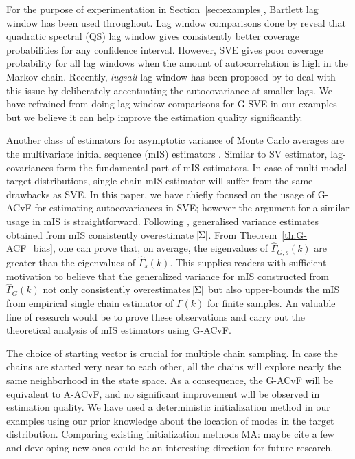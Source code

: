 \documentclass[11pt]{article}
\theoremstyle{remark}
\begin{document}
For the purpose of experimentation in Section~\ref{sec:examples}, Bartlett lag window has been used throughout. Lag window comparisons done by \cite{andr:1991} reveal that quadratic spectral (QS) lag window gives consistently better coverage probabilities for any confidence interval. However, SVE gives poor coverage probability for all lag windows when the amount of autocorrelation is high in the Markov chain. Recently, \textit{lugsail} lag window has been proposed by \cite{vats2018lugsail} to deal with this issue by deliberately accentuating the autocovariance at smaller lags. We have refrained from doing lag window comparisons for G-SVE in our examples but we believe it can help improve the estimation quality significantly.
%

Another class of estimators for asymptotic variance of Monte Carlo averages are the multivariate initial sequence (mIS) estimators \citep{dai:jon:2017}. Similar to SV estimator, lag-covariances form the fundamental part of mIS estimators. In case of multi-modal target distributions, single chain mIS estimator will suffer from the same drawbacks as SVE. In this paper, we have chiefly focused on the usage of G-ACvF for estimating autocovariances in SVE; however the argument for a similar usage in mIS is straightforward.  Following \cite{dai:jon:2017}, generalised variance estimates obtained from mIS consistently overestimate $\abs{\Sigma}$. From Theorem~\ref{th:G-ACF_bias}, one can prove that, on average, the eigenvalues of $\hat{\Gamma}_{G,s}(k)$ are greater than the eigenvalues of $\hat{\Gamma}_s(k)$. This supplies readers with sufficient motivation to believe that the generalized variance for mIS constructed from $\hat{\Gamma}_G(k)$ not only consistently overestimates $\abs{\Sigma}$ but also upper-bounds the mIS from empirical single chain estimator of $\Gamma(k)$ for finite samples. An valuable line of research would be to prove these observations and carry out the theoretical analysis of mIS estimators using G-ACvF. 
%

The choice of starting vector is crucial for multiple chain sampling. In case the chains are started very near to each other, all the chains will explore nearly the same neighborhood in the state space. As a consequence, the G-ACvF will be equivalent to A-ACvF, and no significant improvement will be observed in estimation quality. We have used a deterministic initialization method in our examples using our prior knowledge about the location of modes in the target distribution. Comparing existing initialization methods {\color{orange} MA: maybe cite a few} and developing new ones could be an interesting direction for future research.  
\end{document}
